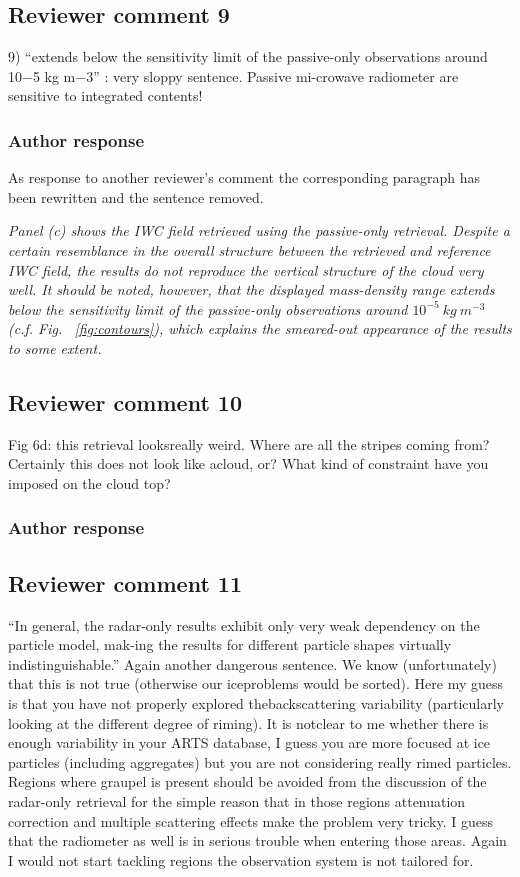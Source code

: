 \documentclass[11pt]{scrartcl}
\begin{document}
\subsection*{Reviewer comment 9}
9) “extends below the sensitivity limit of the passive-only observations around 10−5 kg m−3” : very sloppy sentence. Passive mi-crowave radiometer are sensitive to integrated contents! 

\subsubsection*{Author response}

As response to another reviewer's comment the corresponding paragraph has been rewritten
and the sentence removed.

\textit{ Panel (c) shows the IWC field retrieved using the passive-only
  retrieval. Despite a certain resemblance in the overall structure between the
  retrieved and reference IWC field, the results do not reproduce the vertical
  structure of the cloud very well. It should be noted, however, that the
  displayed mass-density range extends below the sensitivity limit of the
  passive-only observations around $10^{-5}\ \unit{kg\ m^{-3}}$ (c.f. Fig.
  ~\ref{fig:contours}), which explains the smeared-out appearance of the results
  to some extent. }


\subsection*{Reviewer comment 10}
 Fig 6d: this retrieval looksreally weird. Where are all the stripes coming from? Certainly this does not look like acloud, or? What kind of constraint have you imposed on the cloud top?

\subsubsection*{Author response}

\subsection*{Reviewer comment 11}
“In general, the radar-only results exhibit only very weak dependency on the particle model, mak-ing the results for different particle shapes virtually indistinguishable.”  Again another dangerous sentence.  We know (unfortunately) that this is not true (otherwise our iceproblems would be sorted). Here my guess is that you have not properly explored thebackscattering variability (particularly looking at the different degree of riming). It is notclear to me whether there is enough variability in your ARTS database, I guess you are more focused at ice particles (including aggregates) but you are not considering really rimed particles. Regions where graupel is present should be avoided from the discussion of the radar-only retrieval for the simple reason that in those regions attenuation correction and multiple scattering effects make the problem very tricky. I guess that the radiometer as well is in serious trouble when entering those areas.  Again I would not start tackling regions the observation system is not tailored for. 
\end{document}
